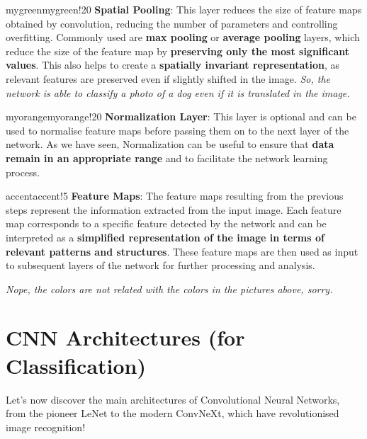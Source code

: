 \begin{remark}{mygreen}{mygreen!20}
\textbf{Spatial Pooling}: This layer reduces the size of feature maps obtained by convolution, reducing the number of parameters and controlling overfitting. Commonly used are \textbf{max pooling} or \textbf{average pooling} layers, which reduce the size of the feature map by \textbf{preserving only the most significant values}. This also helps to create a \textbf{spatially invariant representation}, as relevant features are preserved even if slightly shifted in the image. \textit{So, the network is able to classify a photo of a dog even if it is translated in the image.}
\end{remark}

\begin{remark}{myorange}{myorange!20}
\textbf{Normalization Layer}: This layer is optional and can be used to normalise feature maps before passing them on to the next layer of the network. As we have seen, Normalization can be useful to ensure that \textbf{data remain in an appropriate range} and to facilitate the network learning process.
\end{remark}

\begin{remark}{accent}{accent!5}
\textbf{Feature Maps}: The feature maps resulting from the previous steps represent the information extracted from the input image. Each feature map corresponds to a specific feature detected by the network and can be interpreted as a \textbf{simplified representation of the image in terms of relevant patterns and structures}. These feature maps are then used as input to subsequent layers of the network for further processing and analysis.
\end{remark}
\textit{Nope, the colors are not related with the colors in the pictures above, sorry.}

\section{CNN Architectures (for Classification)}

Let's now discover the main architectures of Convolutional Neural Networks, from the pioneer LeNet to the modern ConvNeXt, which have revolutionised image recognition!

